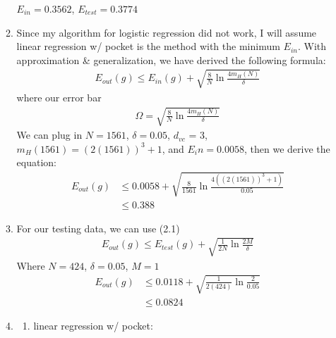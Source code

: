 \documentclass{article}
\begin{document}
\begin{enumerate}
\begin{enumerate}[label=(\alph*)]
                $E_{in} = 0.3562$, $E_{test} = 0.3774$\\[0.25in]
            \item Since my algorithm for logistic regression did not work, I will assume linear regression w/ pocket is the method with the minimum $E_{in}$. With approximation \& generalization, we have derived the following formula:
                \begin{align*}
                    E_{out}(g) \leq E_{in}(g) + \sqrt{\frac{8}{N}\ln{\frac{4m_H(N)}{\delta}}}
                \end{align*}
                where our error bar
                \begin{align*}
                    \Omega = \sqrt{\frac{8}{N}\ln{\frac{4m_H(N)}{\delta}}}
                \end{align*}
                We can plug in $N = 1561$, $\delta = 0.05$, $d_{vc}$ = 3, $m_H(1561) = (2(1561))^{3} + 1$, and $E_in = 0.0058$, then we derive the equation:
                \begin{align*}
                    E_{out}(g) &\leq 0.0058 + \sqrt{\frac{8}{1561}\ln{\frac{4((2(1561))^3+1)}{0.05}}}\\
                    &\leq 0.388
                \end{align*}
            \item For our testing data, we can use (2.1)
                \begin{align*}
                    E_{out}(g) \leq E_{test}(g) + \sqrt{\frac{1}{2N}\ln{\frac{2M}{\delta}}}
                \end{align*}
                Where $N = 424$, $\delta = 0.05$, $M = 1$
                \begin{align*}
                    E_{out}(g) &\leq 0.0118 + \sqrt{\frac{1}{2(424)}\ln{\frac{2}{0.05}}}\\
                    &\leq 0.0824
                \end{align*}
            \item
            \begin{enumerate}[label=(\alph*)]
                \item linear regression w/ pocket:\\

\end{enumerate}
\end{enumerate}
\end{enumerate}
\end{document}
